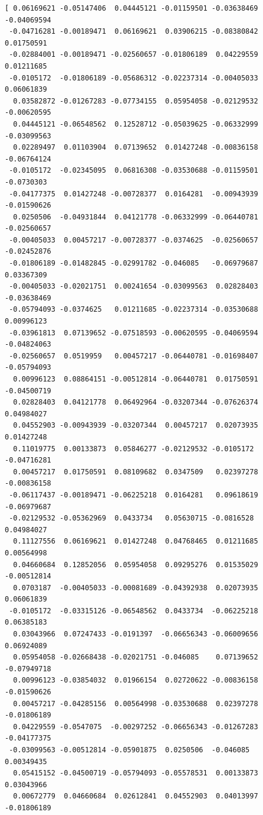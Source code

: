\documentclass[11pt]{article}
\begin{document}
\begin{verbatim}
[ 0.06169621 -0.05147406  0.04445121 -0.01159501 -0.03638469 -0.04069594
 -0.04716281 -0.00189471  0.06169621  0.03906215 -0.08380842  0.01750591
 -0.02884001 -0.00189471 -0.02560657 -0.01806189  0.04229559  0.01211685
 -0.0105172  -0.01806189 -0.05686312 -0.02237314 -0.00405033  0.06061839
  0.03582872 -0.01267283 -0.07734155  0.05954058 -0.02129532 -0.00620595
  0.04445121 -0.06548562  0.12528712 -0.05039625 -0.06332999 -0.03099563
  0.02289497  0.01103904  0.07139652  0.01427248 -0.00836158 -0.06764124
 -0.0105172  -0.02345095  0.06816308 -0.03530688 -0.01159501 -0.0730303
 -0.04177375  0.01427248 -0.00728377  0.0164281  -0.00943939 -0.01590626
  0.0250506  -0.04931844  0.04121778 -0.06332999 -0.06440781 -0.02560657
 -0.00405033  0.00457217 -0.00728377 -0.0374625  -0.02560657 -0.02452876
 -0.01806189 -0.01482845 -0.02991782 -0.046085   -0.06979687  0.03367309
 -0.00405033 -0.02021751  0.00241654 -0.03099563  0.02828403 -0.03638469
 -0.05794093 -0.0374625   0.01211685 -0.02237314 -0.03530688  0.00996123
 -0.03961813  0.07139652 -0.07518593 -0.00620595 -0.04069594 -0.04824063
 -0.02560657  0.0519959   0.00457217 -0.06440781 -0.01698407 -0.05794093
  0.00996123  0.08864151 -0.00512814 -0.06440781  0.01750591 -0.04500719
  0.02828403  0.04121778  0.06492964 -0.03207344 -0.07626374  0.04984027
  0.04552903 -0.00943939 -0.03207344  0.00457217  0.02073935  0.01427248
  0.11019775  0.00133873  0.05846277 -0.02129532 -0.0105172  -0.04716281
  0.00457217  0.01750591  0.08109682  0.0347509   0.02397278 -0.00836158
 -0.06117437 -0.00189471 -0.06225218  0.0164281   0.09618619 -0.06979687
 -0.02129532 -0.05362969  0.0433734   0.05630715 -0.0816528   0.04984027
  0.11127556  0.06169621  0.01427248  0.04768465  0.01211685  0.00564998
  0.04660684  0.12852056  0.05954058  0.09295276  0.01535029 -0.00512814
  0.0703187  -0.00405033 -0.00081689 -0.04392938  0.02073935  0.06061839
 -0.0105172  -0.03315126 -0.06548562  0.0433734  -0.06225218  0.06385183
  0.03043966  0.07247433 -0.0191397  -0.06656343 -0.06009656  0.06924089
  0.05954058 -0.02668438 -0.02021751 -0.046085    0.07139652 -0.07949718
  0.00996123 -0.03854032  0.01966154  0.02720622 -0.00836158 -0.01590626
  0.00457217 -0.04285156  0.00564998 -0.03530688  0.02397278 -0.01806189
  0.04229559 -0.0547075  -0.00297252 -0.06656343 -0.01267283 -0.04177375
 -0.03099563 -0.00512814 -0.05901875  0.0250506  -0.046085    0.00349435
  0.05415152 -0.04500719 -0.05794093 -0.05578531  0.00133873  0.03043966
  0.00672779  0.04660684  0.02612841  0.04552903  0.04013997 -0.01806189

\end{verbatim}
\end{document}
